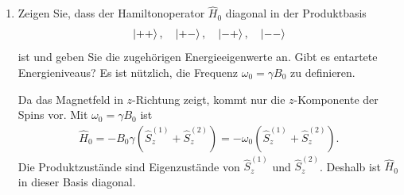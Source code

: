 \documentclass[11pt,a4paper]{scrartcl}
\newcommand{\op}[1]{\hat{#1}}
\begin{document}
    \begin{enumerate}[label=(\alph*)]
        \item Zeigen Sie, dass der Hamiltonoperator $\op H_0$ diagonal in der Produktbasis
        \begin{align*}
            \ket{++},\quad \ket{+-},\quad \ket{-+},\quad \ket{--}
        \end{align*}
        ist und geben Sie die zugehörigen Energieeigenwerte an. Gibt es entartete Energieniveaus? Es ist nützlich, die Frequenz $\omega_0=\gamma B_0$ zu definieren.

        \begin{calculationbox}
            \begin{solutionbox}
                Da das Magnetfeld in $z$-Richtung zeigt, kommt nur die $z$-Komponente der Spins vor. Mit $\omega_0=\gamma B_0$ ist
                \begin{align*}
                    \op H_0
                    =
                    -B_0\gamma\left(\op S_z^{(1)}+\op S_z^{(2)}\right)
                    =
                    -\omega_0\left(\op S_z^{(1)}+\op S_z^{(2)}\right).
                \end{align*}
                Die Produktzustände sind Eigenzustände von $\op S_z^{(1)}$ und $\op S_z^{(2)}$. Deshalb ist $\op H_0$ in dieser Basis diagonal.
            \end{solutionbox}


\end{calculationbox}
\end{enumerate}
\end{document}
